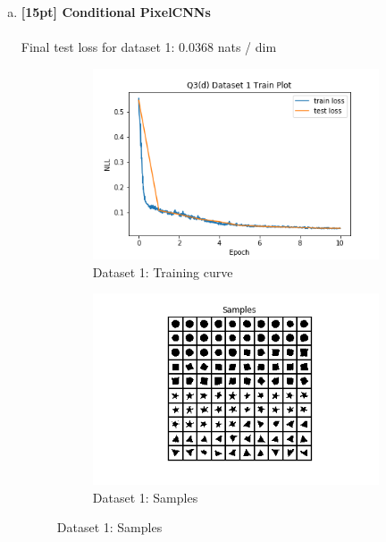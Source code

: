 \documentclass{article}
\begin{document}
\begin{enumerate}[(a)]
\newpage

\item {\bf [15pt] Conditional PixelCNNs} \\\\
Final test loss for dataset 1: 0.0368  nats / dim
\begin{figure}[H]
    \centering
    \begin{subfigure}{0.45\textwidth}
        \centering
        \includegraphics[width=\textwidth]{figures/q3_d_dset1_train_plot.png}
        \caption{Dataset 1: Training curve}
    \end{subfigure}
    \hspace{0.2in}
    \begin{subfigure}{0.45\textwidth}
        \centering
        \includegraphics[width=\textwidth]{figures/q3_d_dset1_samples.png}
        \caption{Dataset 1: Samples}
    \end{subfigure}

\end{figure}
\end{enumerate}
\end{document}
